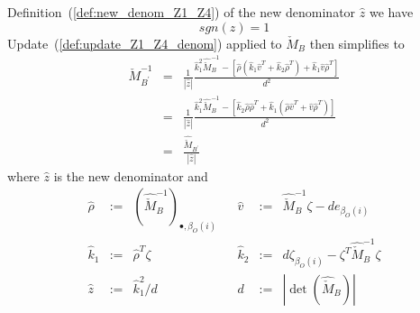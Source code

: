 \documentclass[a4paper]{article}
\begin{document}
Definition~(\ref{def:new_denom_Z1_Z4}) of the new denominator
$\hat{z}$ we have
\begin{equation}
sgn(\hat{z}) = 1
\end{equation} 
Update~(\ref{def:update_Z1_Z4_denom})
applied to $\check{M}_{B}$ then simplifies to
\begin{eqnarray}
\label{def:update_Z1}
\check{M}_{B^{\prime}}^{-1}
&=&
\frac{1}{\left|\hat{z}\right|}
\frac{
\hat{k}_{1}^{2}\hat{\check{M}}_{B}^{-1}
-\left[
  \hat{\rho}
  \left(\hat{k}_{1}\hat{v}^{T} +\hat{k}_{2}\hat{\rho}^{T}\right)
  +\hat{k}_{1}\hat{v}\hat{\rho}^{T}
 \right]
}{d^{2}}
\nonumber \\
&=&
\frac{1}{\left|\hat{z}\right|}
\frac{
\hat{k}_{1}^{2}\hat{\check{M}}_{B}^{-1}
-\left[
  \hat{k}_{2}\hat{\rho}\hat{\rho}^{T}
  +\hat{k}_{1}\left(\hat{\rho}\hat{v}^{T} +\hat{v}\hat{\rho}^{T}\right)
 \right]
}{d^{2}}
\nonumber \\
&=&
\frac{\hat{\check{M}}_{B^{\prime}}}{\left|\hat{z}\right|}
\end{eqnarray}
where $\hat{z}$ is the new denominator and
\begin{equation}
\label{def:update_Z1_entities}
\begin{array}{rclcrcl}
\hat{\rho}
&:=&
\left(\hat{\check{M}}_{B}^{-1}\right)_{\bullet, \beta_{O}(i)}
&&
\hat{v}
&:=&
\hat{\check{M}}_{B}^{-1}\zeta - d e_{\beta_{O}(i)}
\\
\hat{k}_{1}
&:=&
\hat{\rho}^{T}\zeta
&&
\hat{k}_{2}
&:=&
d\zeta_{\beta_{O}(i)}- \zeta^{T}\hat{\check{M}}_{B}^{-1}\zeta
\\
\hat{z}
&:=&
\hat{k}_{1}^{2}/d
&&
d
&:=&
\left|\det(\hat{\check{M}}_{B})\right|
\end{array}
\end{equation}
\end{document}
